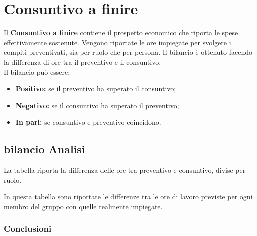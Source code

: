 \chapter{Consuntivo a finire}
Il \textbf{Consuntivo a finire} contiene il prospetto economico che riporta le spese effettivamente sostenute. Vengono riportate le ore impiegate per svolgere i compiti preventivati, sia per
ruolo che per persona. Il bilancio è ottenuto facendo la differenza di ore tra il preventivo e il consuntivo.\\
Il bilancio può essere:
\begin{itemize}
    \item \textbf{Positivo:} se il preventivo ha superato il consuntivo;
    \item \textbf{Negativo:} se il consuntivo ha superato il preventivo;
    \item \textbf{In pari:} se consuntivo e preventivo coincidono.
\end{itemize}
\section{bilancio Analisi}
La tabella riporta la differenza delle ore tra preventivo e consuntivo, divise per ruolo.  
\begin{table}
    
\end{table}
In questa tabella  sono riportate le differenze tra le ore di lavoro previste per ogni membro del gruppo con quelle realmente impiegate.

\subsection{Conclusioni}